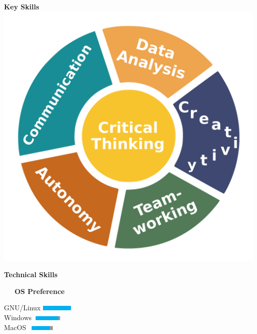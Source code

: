 \begin{minipage}{0.32\columnwidth}
\begin{flushright}
        \textcolor{my_blue}{\bf\Large Key Skills}\\
        \includegraphics[scale=0.3]{figs/skills1.pdf}\\
        \vspace*{4mm}

        \textcolor{my_blue}{\bf\Large Technical Skills}\\ \vspace*{4mm}

        \textcolor{my_blue}{\bf\large \textbullet~~ OS Preference}\\
        \vspace*{3mm}

        {GNU/Linux
        }\includegraphics[width=1.5cm,height=0.27cm]{figs/5stars.pdf}\\
        {Windows
        }\includegraphics[width=1.5cm,height=0.22cm]{figs/4-8stars.pdf}\\
        {MacOS
        }\includegraphics[width=1.5cm,height=0.19cm]{figs/4stars.pdf}\\
        \vspace*{4mm}


\end{flushright}
\end{minipage}
